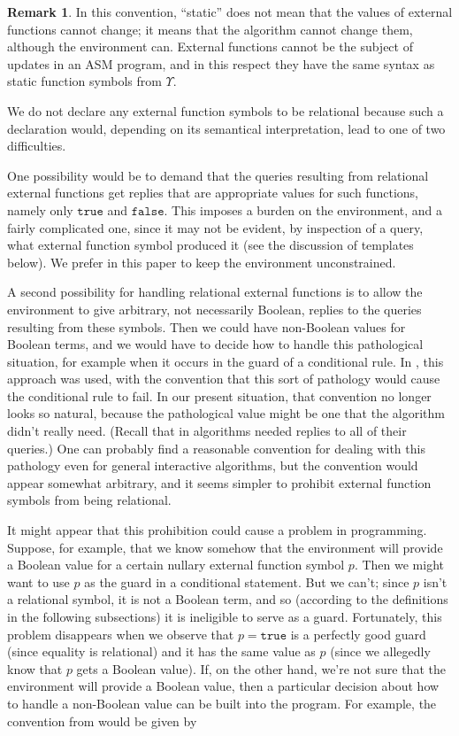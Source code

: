 \documentclass{LMCS}
\theoremstyle{definition}
\newtheorem{rmk}[thm]{Remark}
\newcommand{\U}{\Upsilon}
\newcommand{\ttt}[1]{\ensuremath{\mathtt {#1}}}
\begin{document}
\begin{rmk}
  In this convention, ``static'' does not mean that the values of
  external functions cannot change; it means that the algorithm cannot
  change them, although the environment can.  External functions
  cannot be the subject of updates in an ASM program, and in this
  respect they have the same syntax as static function symbols from
  $\U$.

We do not declare any external function symbols to be relational
because such a declaration would, depending on its semantical
interpretation, lead to one of two difficulties.

One possibility would be to demand that the queries resulting from
relational external functions get replies that are appropriate values
for such functions, namely only \ttt{true} and \ttt{false}.  This
imposes a burden on the environment, and a fairly complicated one,
since it may not be evident, by inspection of a query, what external
function symbol produced it (see the discussion of templates below).
We prefer in this paper to keep the environment unconstrained.

A second possibility for handling relational external functions is to
allow the environment to give arbitrary, not necessarily Boolean,
replies to the queries resulting from these symbols.  Then we could
have non-Boolean values for Boolean terms, and we would have to decide
how to handle this pathological situation, for example when it occurs
in the guard of a conditional rule.  In \cite[Section~5]{oa2}, this
approach was used, with the convention that this sort of pathology
would cause the conditional rule to fail.  In our present situation,
that convention no longer looks so natural, because the pathological
value might be one that the algorithm didn't really need.  (Recall
that in \cite{oa1,oa2,oa3} algorithms needed replies to all of their
queries.)  One can probably find a reasonable convention for dealing
with this pathology even for general interactive algorithms, but the
convention would appear somewhat arbitrary, and it seems simpler to
prohibit external function symbols from being relational.

It might appear that this prohibition could cause a problem in
programming.  Suppose, for example, that we know somehow that the
environment will provide a Boolean value for a certain nullary
external function symbol $p$.  Then we might want to use $p$ as the
guard in a conditional statement.  But we can't; since $p$ isn't a
relational symbol, it is not a Boolean term, and so (according to the
definitions in the following subsections) it is ineligible to serve as
a guard.  Fortunately, this problem disappears when we observe that
$p=\ttt{true}$ is a perfectly good guard (since equality is
relational) and it has the same value as $p$ (since we allegedly know
that $p$ gets a Boolean value).  If, on the other hand, we're not sure
that the environment will provide a Boolean value, then a particular
decision about how to handle a non-Boolean value can be built into the
program.  For example, the convention from \cite{oa2} would be given
by


\end{rmk}
\end{document}
